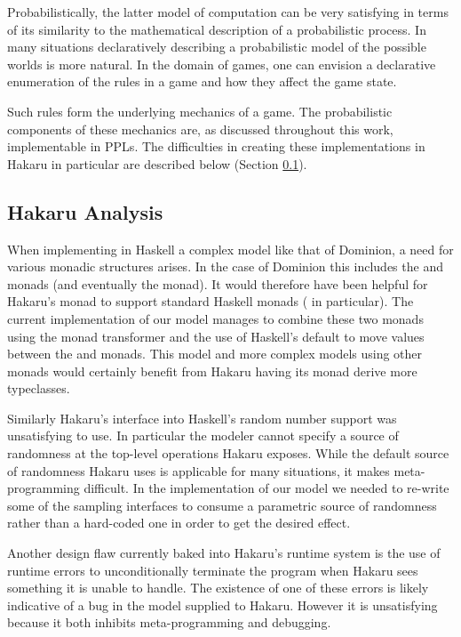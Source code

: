 Probabilistically, the latter model of computation can be very satisfying
in terms of its similarity to the mathematical description of a probabilistic
process. In many situations declaratively
describing a probabilistic model of the possible worlds is more natural.
In the domain of games, one can envision a declarative enumeration
of the rules in a game and how they affect the game state.

Such rules form the underlying mechanics of a game. The probabilistic
components of these mechanics are, as discussed throughout this work,
implementable in PPLs. The difficulties in creating these implementations
in Hakaru in particular are described below (Section \ref{sec:hakaru-analysis}).

\subsection{Hakaru Analysis} \label{sec:hakaru-analysis}

When implementing in Haskell a complex model like that of Dominion, a
need for various monadic structures arises. In the case of Dominion
this includes the  and  monads (and eventually
the  monad). It would therefore have been helpful for Hakaru's
 monad to support standard Haskell monads ( in
particular). The current implementation of our model manages to combine
these two monads using the  monad transformer and the use
of Haskell's default  to move values between the  and
 monads. This model and more complex models using other
monads would certainly benefit from Hakaru having its 
monad derive more typeclasses.

Similarly Hakaru's interface into Haskell's random number support was
unsatisfying to use. In particular the modeler cannot specify a source
of randomness at the top-level operations Hakaru exposes. While the
default source of randomness Hakaru uses is applicable for many situations,
it makes meta-programming difficult. In the implementation of our model
we needed to re-write some of the sampling interfaces to consume a parametric
source of randomness rather than a hard-coded one in order to get the
desired effect.

Another design flaw currently baked into Hakaru's runtime system is the
use of runtime errors to unconditionally terminate the program when
Hakaru sees something it is unable to handle. The existence of
one of these errors is likely indicative of a bug in the model supplied
to Hakaru. However it is unsatisfying because it both inhibits
meta-programming and debugging.

